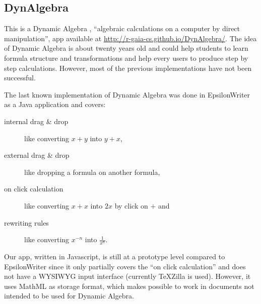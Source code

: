 \subsection{DynAlgebra}

This is a Dynamic Algebra \cite{Nicaud1}, ``algebraic calculations
on a computer by direct manipulation'', app available at
\href{http://r-gaia-cs.github.io/DynAlgebra/}{http://r-gaia-cs.github.io/DynAlgebra/}.
The idea of Dynamic Algebra is about twenty years old and could help
students to learn formula structure and transformations and help every users to
produce step by step calculations. However, most of the previous implementations
have not been successful.

The last known implementation of Dynamic Algebra was done in EpsilonWriter
\cite{Nicaud2} as a Java application and covers:
\begin{description}
  \item[internal drag \& drop] like converting $x + y$ into $y + x$,
  \item[external drag \& drop] like dropping a formula on another formula,
  \item[on click calculation] like converting $x + x$ into $2 x$ by click on $+$ and
  \item[rewriting rules] like converting $x^{-n}$ into $\frac{1}{x^n}$.
\end{description}

Our app, written in Javascript, is still at a prototype level compared
to EpsilonWriter since it only partially
covers the ``on click calculation'' and does not have a WYSIWYG input interface
(currently TeXZilla is used). However, it uses MathML as storage format,
which makes possible to work in documents not intended to be used for
Dynamic Algebra.
